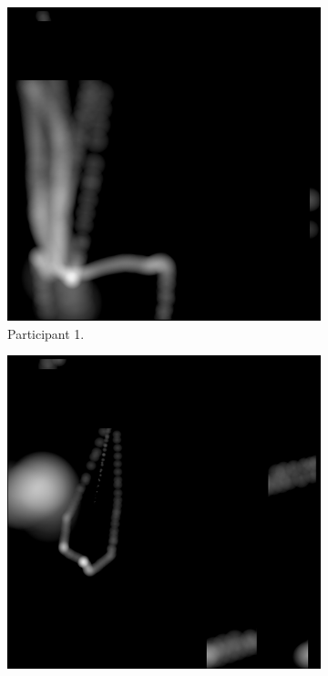\begin{figure}[!ht]\centering
    \begin{subfigure}[b]{0.24\textwidth}
        \centering
        \includegraphics[width=\textwidth]{img/data/Panel14/single/1.png}
        \caption{Participant 1.}
    \end{subfigure}
    \hfill
    \begin{subfigure}[b]{0.24\textwidth}
        \centering
        \includegraphics[width=\textwidth]{img/data/Panel14/single/2.png}

\end{subfigure}
\end{figure}

